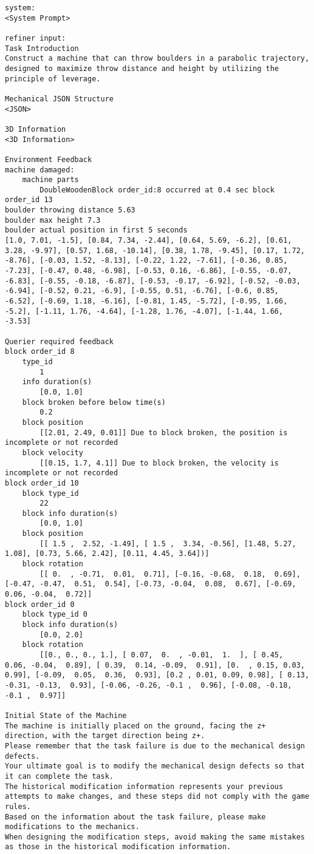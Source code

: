 \begin{lstlisting}
system:
<System Prompt>

refiner input:
Task Introduction
Construct a machine that can throw boulders in a parabolic trajectory, designed to maximize throw distance and height by utilizing the principle of leverage.

Mechanical JSON Structure
<JSON>

3D Information
<3D Information>

Environment Feedback
machine damaged:
    machine parts
        DoubleWoodenBlock order_id:8 occurred at 0.4 sec block order_id 13 
boulder throwing distance 5.63
boulder max height 7.3
boulder actual position in first 5 seconds
[1.0, 7.01, -1.5], [0.84, 7.34, -2.44], [0.64, 5.69, -6.2], [0.61, 3.28, -9.97], [0.57, 1.68, -10.14], [0.38, 1.78, -9.45], [0.17, 1.72, -8.76], [-0.03, 1.52, -8.13], [-0.22, 1.22, -7.61], [-0.36, 0.85, -7.23], [-0.47, 0.48, -6.98], [-0.53, 0.16, -6.86], [-0.55, -0.07, -6.83], [-0.55, -0.18, -6.87], [-0.53, -0.17, -6.92], [-0.52, -0.03, -6.94], [-0.52, 0.21, -6.9], [-0.55, 0.51, -6.76], [-0.6, 0.85, -6.52], [-0.69, 1.18, -6.16], [-0.81, 1.45, -5.72], [-0.95, 1.66, -5.2], [-1.11, 1.76, -4.64], [-1.28, 1.76, -4.07], [-1.44, 1.66, -3.53]

Querier required feedback
block order_id 8 
    type_id 
        1 
    info duration(s) 
        [0.0, 1.0]
    block broken before below time(s) 
        0.2
    block position 
        [[2.01, 2.49, 0.01]] Due to block broken, the position is incomplete or not recorded
    block velocity
        [[0.15, 1.7, 4.1]] Due to block broken, the velocity is incomplete or not recorded
block order_id 10
    block type_id
        22
    block info duration(s)
        [0.0, 1.0]
    block position
        [[ 1.5 ,  2.52, -1.49], [ 1.5 ,  3.34, -0.56], [1.48, 5.27, 1.08], [0.73, 5.66, 2.42], [0.11, 4.45, 3.64])]
    block rotation
        [[ 0.  , -0.71,  0.01,  0.71], [-0.16, -0.68,  0.18,  0.69], [-0.47, -0.47,  0.51,  0.54], [-0.73, -0.04,  0.08,  0.67], [-0.69,  0.06, -0.04,  0.72]]
block order_id 0
    block type_id 0
    block info duration(s)
        [0.0, 2.0]
    block rotation
        [[0., 0., 0., 1.], [ 0.07,  0.  , -0.01,  1.  ], [ 0.45,  0.06, -0.04,  0.89], [ 0.39,  0.14, -0.09,  0.91], [0.  , 0.15, 0.03, 0.99], [-0.09,  0.05,  0.36,  0.93], [0.2 , 0.01, 0.09, 0.98], [ 0.13, -0.31, -0.13,  0.93], [-0.06, -0.26, -0.1 ,  0.96], [-0.08, -0.18, -0.1 ,  0.97]]

Initial State of the Machine
The machine is initially placed on the ground, facing the z+ direction, with the target direction being z+.
Please remember that the task failure is due to the mechanical design defects. 
Your ultimate goal is to modify the mechanical design defects so that it can complete the task.
The historical modification information represents your previous attempts to make changes, and these steps did not comply with the game rules.
Based on the information about the task failure, please make modifications to the mechanics. 
When designing the modification steps, avoid making the same mistakes as those in the historical modification information.


\end{lstlisting}
